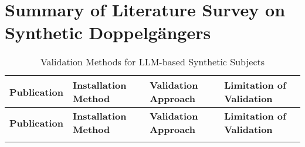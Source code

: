 \chapter{Summary of Literature Survey on Synthetic Doppelgängers}
\label{app:lit-review}

{ %
\begin{longtable}{| L{4.5cm} | L{3.5cm} | L{3.5cm} | L{3.5cm} |}

\caption{Validation Methods for LLM-based Synthetic Subjects}
\label{tab:llm_validation}\\

\hline
{}
\textbf{Publication} & \textbf{Installation Method} & \textbf{Validation Approach} & \textbf{Limitation of Validation}\\
\hline
\endfirsthead

\hline
{}
\textbf{Publication} & \textbf{Installation Method} & \textbf{Validation Approach} & \textbf{Limitation of Validation}\\
\hline
\endhead

\endfoot

\endlastfoot


\end{longtable}}
